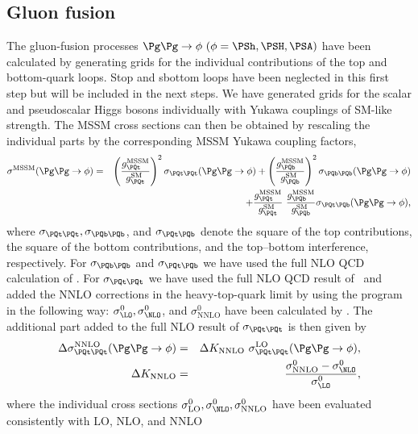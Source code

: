 \subsection{Gluon fusion}
The gluon-fusion processes $\Pg\Pg\to\phi~(\phi = \PSh,\PSH,\PSA)$ have been
calculated by generating grids for the individual contributions of the
top and bottom-quark loops. Stop and sbottom loops have been neglected
in this first step but will be included in the next steps. We have
generated grids for the scalar and pseudoscalar Higgs bosons
individually with Yukawa couplings of SM-like strength. The MSSM cross
sections can then be obtained by rescaling the individual parts by the
corresponding MSSM Yukawa coupling factors,
\begin{eqnarray}
\sigma^{\mathrm{MSSM}}(\Pg\Pg\to\phi) & = & \left(\frac{g_{\PQt}^{\mathrm{MSSM}}}{g_{\PQt}^{\mathrm{SM}}}\right)^2
\sigma_{\PQt\PQt}(\Pg\Pg\to\phi) + \left(\frac{g_{\PQb}^{\mathrm{MSSM}}}{g_{\PQb}^{\mathrm{SM}}}\right)^2
\sigma_{\PQb\PQb}(\Pg\Pg\to\phi) \nonumber \\
& & +
\frac{g_{\PQt}^{\mathrm{MSSM}}}{g_{\PQt}^{\mathrm{SM}}}~\frac{g_{\PQb}^{\mathrm{MSSM}}}{g_{\PQb}^{\mathrm{SM}}}
\sigma_{\PQt\PQb}(\Pg\Pg\to\phi),
\label{YRHXS_MSSM_neutral_eq1}
\end{eqnarray}
where $\sigma_{\PQt\PQt}, \sigma_{\PQb\PQb}$, and $\sigma_{\PQt\PQb}$ denote the square of
the top contributions, the square of the bottom contributions, and the
top--bottom interference, respectively. For $\sigma_{\PQb\PQb}$ and
$\sigma_{\PQt\PQb}$ we have used the full NLO QCD calculation of \HIGLU
\cite{Spira:1995mt}. For $\sigma_{\PQt\PQt}$ we have used the full NLO QCD
result of \HIGLU~and added the NNLO corrections in the heavy-top-quark
limit by using the program \gghnnlo~\cite{Harlander:2002wh,Harlander:2002vv} in the following way:
$\sigma^0_{\LO}, \sigma^0_{\NLO}$, and $\sigma^0_{\mathrm{NNLO}}$ have been
calculated by \gghnnlo.  The additional part added to the full NLO
result of $\sigma_{\PQt\PQt}$ is then given by
\begin{eqnarray}
\Delta\sigma^{\mathrm{NNLO}}_{\PQt\PQt}(\Pg\Pg\to\phi) & = & \Delta K_{\mathrm{NNLO}}~
\sigma_{\PQt\PQt}^{\mathrm{LO}}(\Pg\Pg\to\phi), \nonumber \\
\Delta K_{\mathrm{NNLO}} & = & \frac{\sigma^0_{\mathrm{NNLO}}-\sigma^0_{\NLO}}{\sigma^0_{\LO}},
\end{eqnarray}
where the individual cross sections $\sigma^0_{\mathrm{LO}}, \sigma^0_{\NLO},
\sigma^0_{\mathrm{NNLO}}$ have been evaluated consistently with LO, NLO, and NNLO
